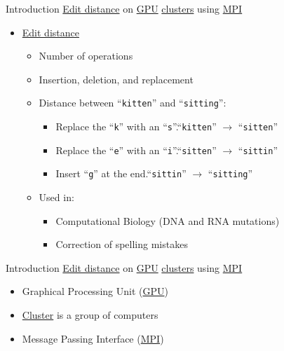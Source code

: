\begin{frame}{Introduction}
\underline{Edit distance} on \underline{GPU} \underline{clusters} using \underline{MPI}

\begin{itemize}
    \item \underline{Edit distance}
    \begin{itemize}
        \item Number of operations
        \item Insertion, deletion, and replacement \pause
        \item Distance between ``\texttt{kitten}'' and ``\texttt{sitting}'':
        \begin{itemize}
                \item Replace the ``\texttt{k}'' with an ``\texttt{s}''.\hfill ``\texttt{kitten}'' $\rightarrow$ ``\texttt{sitten}'' $\qquad\enspace\qquad$
                \item Replace the ``\texttt{e}'' with an ``\texttt{i}''.\hfill ``\texttt{sitten}'' $\rightarrow$ ``\texttt{sittin}'' $\qquad\enspace\qquad$
                \item Insert ``\texttt{g}'' at the end.\hfill ``\texttt{sittin}'' $\rightarrow$ ``\texttt{sitting}'' $\qquad\qquad$ \pause
        \end{itemize}
        \item Used in:
        \begin{itemize}
            \item Computational Biology (DNA and RNA mutations)
            \item Correction of spelling mistakes
        \end{itemize}
    \end{itemize}
\end{itemize}
\end{frame}
\begin{frame}{Introduction}
\underline{Edit distance} on \underline{GPU} \underline{clusters} using \underline{MPI}

\begin{itemize}

    \item Graphical Processing Unit (\underline{GPU}) \pause

    \item \underline{Cluster} is a group of computers \pause

    \item Message Passing Interface (\underline{MPI})
\end{itemize}
\end{frame}

